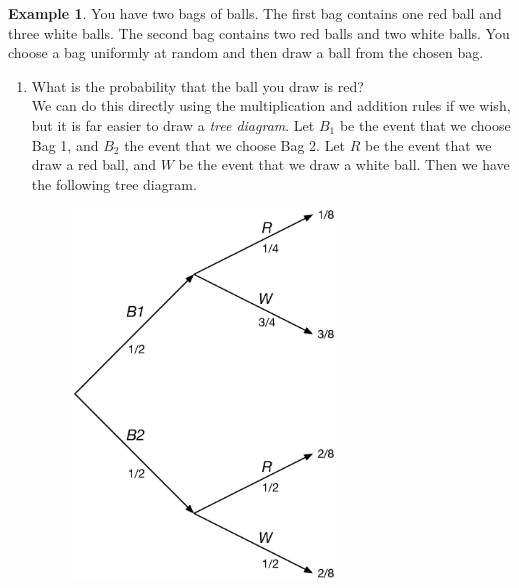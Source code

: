 \documentclass[12pt]{article}
\theoremstyle{definition}
\newtheorem*{example}{Example}
\theoremstyle{remark}
\begin{document}
\begin{example}You have two bags of balls. The first bag contains one red ball and three white balls. The second bag contains two red balls and two white balls. You choose a bag uniformly at random and then draw a ball from the chosen bag.
\begin{enumerate}
\item What is the probability that the ball you draw is red?\\

We can do this directly using the multiplication and addition rules if we wish, but it is far easier to draw a \emph{tree diagram}. Let $B_1$ be the event that we choose Bag 1, and $B_2$ the event that we choose Bag 2. Let $R$ be the event that we draw a red ball, and $W$ be the event that we draw a white ball. Then we have the following tree diagram. 
\begin{figure}[H]
\centering
\includegraphics[width=7cm]{tree1.eps}
\end{figure}


\end{enumerate}
\end{example}
\end{document}
